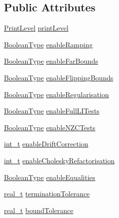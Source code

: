 \subsection*{Public Attributes}
\begin{DoxyCompactItemize}
\item 
\hyperlink{_types_8hpp_a83ff212f474e3669d8fac2d727f65de5}{Print\+Level} \hyperlink{class_options_a3c7327943ce25f36479356d33a0b0723}{print\+Level}
\item 
\hyperlink{_types_8hpp_a20f82124c82b6f5686a7fce454ef9089}{Boolean\+Type} \hyperlink{class_options_a8346f6e9a849cc3da7cbbede72a10196}{enable\+Ramping}
\item 
\hyperlink{_types_8hpp_a20f82124c82b6f5686a7fce454ef9089}{Boolean\+Type} \hyperlink{class_options_aa691471f2994643343ddcf2b697a19aa}{enable\+Far\+Bounds}
\item 
\hyperlink{_types_8hpp_a20f82124c82b6f5686a7fce454ef9089}{Boolean\+Type} \hyperlink{class_options_abba3f3ece76237c647b5719eae9c26f2}{enable\+Flipping\+Bounds}
\item 
\hyperlink{_types_8hpp_a20f82124c82b6f5686a7fce454ef9089}{Boolean\+Type} \hyperlink{class_options_adebe0981cee6bd30e7f242fa16efddb7}{enable\+Regularisation}
\item 
\hyperlink{_types_8hpp_a20f82124c82b6f5686a7fce454ef9089}{Boolean\+Type} \hyperlink{class_options_a043d6f962a785e05d304950d01461432}{enable\+Full\+L\+I\+Tests}
\item 
\hyperlink{_types_8hpp_a20f82124c82b6f5686a7fce454ef9089}{Boolean\+Type} \hyperlink{class_options_aeec0473a768989b1a2f587f51709636a}{enable\+N\+Z\+C\+Tests}
\item 
\hyperlink{_types_8hpp_ab6fd6105e64ed14a0c9281326f05e623}{int\+\_\+t} \hyperlink{class_options_a702013b2914bd8122a5dc803d1444a59}{enable\+Drift\+Correction}
\item 
\hyperlink{_types_8hpp_ab6fd6105e64ed14a0c9281326f05e623}{int\+\_\+t} \hyperlink{class_options_a6618c6e219b55ce73a037b49176bc8cb}{enable\+Cholesky\+Refactorisation}
\item 
\hyperlink{_types_8hpp_a20f82124c82b6f5686a7fce454ef9089}{Boolean\+Type} \hyperlink{class_options_a21c673d77ae5210038a05ca2a41bd1da}{enable\+Equalities}
\item 
\hyperlink{qp_o_a_s_e_s__wrapper_8h_a0d00e2b3dfadee81331bbb39068570c4}{real\+\_\+t} \hyperlink{class_options_ad18a17e6fd0c84625ad44261a7f73474}{termination\+Tolerance}
\item 
\hyperlink{qp_o_a_s_e_s__wrapper_8h_a0d00e2b3dfadee81331bbb39068570c4}{real\+\_\+t} \hyperlink{class_options_a9cc43ec93c854bd0302de1a940fda5dd}{bound\+Tolerance}

\end{DoxyCompactItemize}
